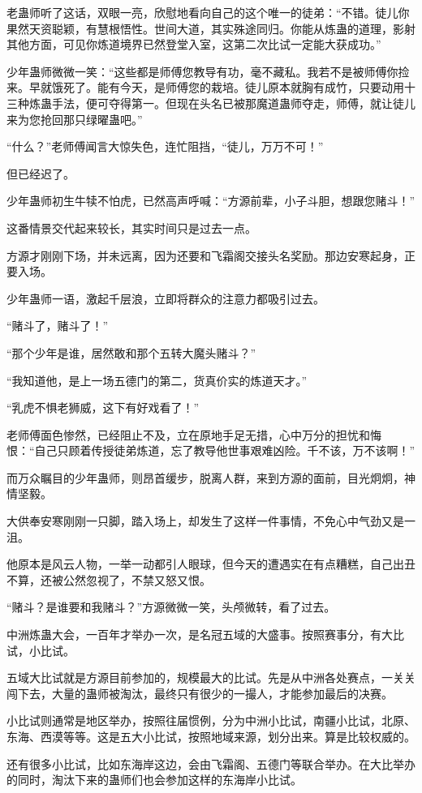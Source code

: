\begin{this_body}
老蛊师听了这话，双眼一亮，欣慰地看向自己的这个唯一的徒弟：“不错。徒儿你果然天资聪颖，有慧根悟性。世间大道，其实殊途同归。你能从炼蛊的道理，影射其他方面，可见你炼道境界已然登堂入室，这第二次比试一定能大获成功。”

少年蛊师微微一笑：“这些都是师傅您教导有功，毫不藏私。我若不是被师傅你捡来。早就饿死了。能有今天，是师傅您的栽培。徒儿原本就胸有成竹，只要动用十三种炼蛊手法，便可夺得第一。但现在头名已被那魔道蛊师夺走，师傅，就让徒儿来为您抢回那只绿曜蛊吧。”

“什么？”老师傅闻言大惊失色，连忙阻挡，“徒儿，万万不可！”

但已经迟了。

少年蛊师初生牛犊不怕虎，已然高声呼喊：“方源前辈，小子斗胆，想跟您赌斗！”

这番情景交代起来较长，其实时间只是过去一点。

方源才刚刚下场，并未远离，因为还要和飞霜阁交接头名奖励。那边安寒起身，正要入场。

少年蛊师一语，激起千层浪，立即将群众的注意力都吸引过去。

“赌斗了，赌斗了！”

“那个少年是谁，居然敢和那个五转大魔头赌斗？”

“我知道他，是上一场五德门的第二，货真价实的炼道天才。”

“乳虎不惧老狮威，这下有好戏看了！”

老师傅面色惨然，已经阻止不及，立在原地手足无措，心中万分的担忧和悔恨：“自己只顾着传授徒弟炼道，忘了教导他世事艰难凶险。千不该，万不该啊！”

而万众瞩目的少年蛊师，则昂首缓步，脱离人群，来到方源的面前，目光炯炯，神情坚毅。

大供奉安寒刚刚一只脚，踏入场上，却发生了这样一件事情，不免心中气劲又是一沮。

他原本是风云人物，一举一动都引人眼球，但今天的遭遇实在有点糟糕，自己出丑不算，还被公然忽视了，不禁又怒又恨。

“赌斗？是谁要和我赌斗？”方源微微一笑，头颅微转，看了过去。

中洲炼蛊大会，一百年才举办一次，是名冠五域的大盛事。按照赛事分，有大比试，小比试。

五域大比试就是方源目前参加的，规模最大的比试。先是从中洲各处赛点，一关关闯下去，大量的蛊师被淘汰，最终只有很少的一撮人，才能参加最后的决赛。

小比试则通常是地区举办，按照往届惯例，分为中洲小比试，南疆小比试，北原、东海、西漠等等。这是五大小比试，按照地域来源，划分出来。算是比较权威的。

还有很多小比试，比如东海岸这边，会由飞霜阁、五德门等联合举办。在大比举办的同时，淘汰下来的蛊师们也会参加这样的东海岸小比试。


\end{this_body}
